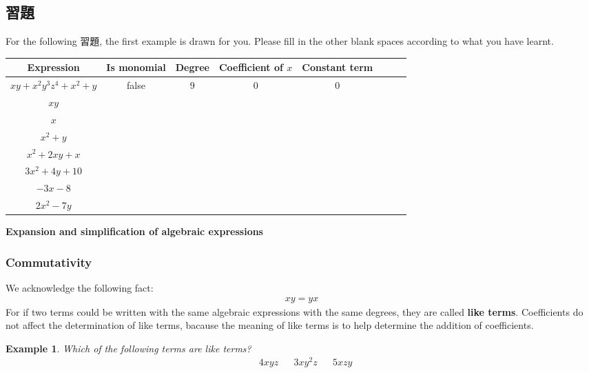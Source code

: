 \documentclass[12pt]{article}
\newtheorem{example}{Example}
\begin{document}
    \subsection*{習題}
    For the following 習題, the first example is drawn for you. Please fill in the other blank spaces according to what you have learnt.
    \begin{center}
        \begin{tabular}{|c|c|c|c|c|c|c|c|}
            \hline
            Expression&Is monomial&Degree&Coefficient of $x$&Constant term\\
            \hline
            $xy+x^2y^3z^4+x^2+y$&false&9&0&0\\
            \hline
            $xy$&&&&\\
            \hline
            $x$&&&&\\
            \hline
            $x^2+y$&&&&\\
            \hline
            $x^2+2xy+x$&&&&\\
            \hline
            $3x^2+4y+10$&&&&\\
            \hline
            $-3x-8$&&&&\\
            \hline
            $2x^2-7y$&&&&\\
            \hline
        \end{tabular}
    \end{center}

    \begin{center}
        \textbf{Expansion and simplification of algebraic expressions}
    \end{center}

    \subsubsection*{Commutativity}

    We acknowledge the following fact:\begin{align*}
        xy=yx
    \end{align*}
    For if two terms could be written with the same algebraic expressions with the same degrees, they are called \textbf{like terms}. Coefficients do not affect the determination of like terms, bacause the meaning of like terms is to help determine the addition of coefficients.

    \begin{example}
        Which of the following terms are like terms?\begin{align*}
            &4xyz&&3xy^2z&&5xzy
        \end{align*}
    \end{example}
\end{document}
